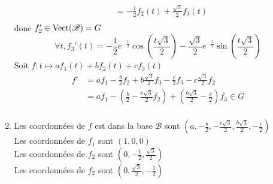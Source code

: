 \begin{enumerate}
\begin{align*}
			&= -\frac{1}{2} f_2(t) + \frac{\sqrt{3}}{2} f_3(t) \\
		\end{align*}
		donc $f'_2 \in \operatorname{Vect}(\mathcal{B}) = G$ \[
			\forall t, f_3'(t) = -\frac{1}{2}e^{-\frac{t}{2}}\cos\left( \frac{t\sqrt{3}}{2}  \right) - \frac{\sqrt{3}}{2} e^{-\frac{t}{2}} \sin\left( \frac{t\sqrt{3} }{2} \right) 
		\] Soit $f: t \mapsto af_1(t) + bf_2(t) + cf_3(t)$ \\
		\begin{align*}
			f' &= af_1-\frac{b}{2}f_2 + b\frac{\sqrt{3}}{2}f_3 - \frac{c}{2}f_3 - c\frac{\sqrt{3}}{2}f_2 \\
			&= af_1-\left( \frac{b}{2} - \frac{c\sqrt{3}}{2} f_2 \right) + \left( \frac{b\sqrt{3}}{2}- \frac{c}{2} \right) f_3 \in G \\
		\end{align*}
	\item Les coordonnées de $f$ est dans la base $\mathcal{B}$ sont $\left( a, -\frac{b}{2}, -\frac{c\sqrt{3}}{2}, \frac{b\sqrt{3}}{2}, -\frac{c}{2} \right)$ \\
		Les coordonnées de $f_1$ sont $(1,0,0)$\\
		Les coordonnées de $f_2$ sont $\left(0,-\frac{1}{2},\frac{\sqrt{3}}{2}\right)$\\
		Les coordonnées de $f_2$ sont $\left(0,\frac{\sqrt{3}}{2},-\frac{1}{2}\right)$\\
\end{enumerate}

